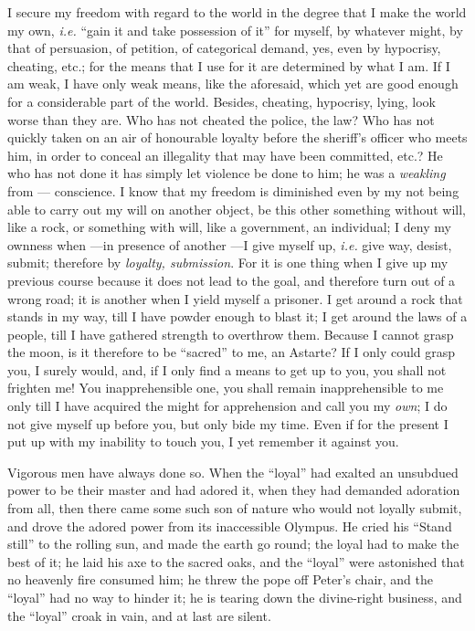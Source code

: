 I secure my freedom with regard to the world in the degree that I make the 
world my own, \textit{i.e.} ``gain it and take possession of it'' for 
myself, by whatever might, by that of persuasion, of petition, of categorical 
demand, yes, even by hypocrisy, cheating, etc.; for the means that I use for 
it are determined by what I am. If I am weak, I have only weak means, like the 
aforesaid, which yet are good enough for a considerable part of the world. 
Besides, cheating, hypocrisy, lying, look worse than they are. Who has not 
cheated the police, the law? Who has not quickly taken on an air of honourable 
loyalty before the sheriff's officer who meets him, in order to conceal an 
illegality that may have been committed, etc.? He who has not done it has 
simply let violence be done to him; he was a \textit{weakling} from --- 
conscience. I know that my freedom is diminished even by my not being able to 
carry out my will on another object, be this other something without will, 
like a rock, or something with will, like a government, an individual; I deny 
my ownness when ---in presence of another ---I give myself up, \textit{i.e.} 
give way, desist, submit; therefore by \textit{loyalty, submission}. For it is 
one thing when I give up my previous course because it does not lead to the 
goal, and therefore turn out of a wrong road; it is another when I yield 
myself a prisoner. I get around a rock that stands in my way, till I have 
powder enough to blast it; I get around the laws of a people, till I have 
gathered strength to overthrow them. Because I cannot grasp the moon, is it 
therefore to be ``sacred'' to me, an Astarte? If I only could grasp you, I 
surely would, and, if I only find a means to get up to you, you shall not 
frighten me! You inapprehensible one, you shall remain inapprehensible to me 
only till I have acquired the might for apprehension and call you my 
\textit{own}; I do not give myself up before you, but only bide my time. Even 
if for the present I put up with my inability to touch you, I yet remember it 
against you.

Vigorous men have always done so. When the ``loyal'' had exalted an 
unsubdued power to be their master and had adored it, when they had demanded 
adoration from all, then there came some such son of nature who would not 
loyally submit, and drove the adored power from its inaccessible Olympus. He 
cried his ``Stand still'' to the rolling sun, and made the earth go round; 
the loyal had to make the best of it; he laid his axe to the sacred oaks, and 
the ``loyal'' were astonished that no heavenly fire consumed him; he threw 
the pope off Peter's chair, and the ``loyal'' had no way to hinder it; he is 
tearing down the divine-right business, and the ``loyal'' croak in vain, and 
at last are silent.


